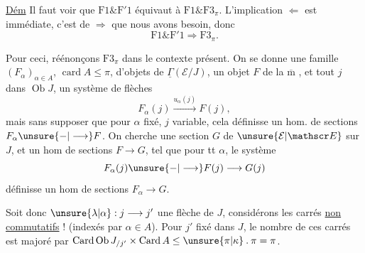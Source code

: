 
\uline{Dém} Il faut voir que $\mathrm F1\mathbin{\&}\mathrm F'1$ équivaut à $\mathrm F1\mathbin{\&}\mathrm F3_{\pi}$. L'implication $\Longleftarrow$ est \inserted{$\pm$} immédiate, c'est de $\Longrightarrow$ que nous avons besoin, donc
\[
 \mathrm F1\mathbin{\&}\mathrm F'1\Longrightarrow\mathrm F3_{\pi}.
\]

Pour ceci,  réénonçons $\mathrm F3_{\pi}$ dans le contexte présent. On se donne une famille $(F_{\alpha})_{\alpha\in A}$, $\operatorname{card}A\leq\pi$, d'objets de $\underline{\Gamma}(\mathcal E/J)$, un objet $F$ de la $\overline{\mathrm m}$ , et  tout $j$ dans $\operatorname{Ob}J$, un système de flèches
\[
 F_{\alpha}(j)\xrightarrow{u_{\alpha}(j)} F(j),
\]
mais sans supposer que pour $\alpha$ fixé, $j$ variable,
cela définisse un hom. de sections $F_{\alpha}\unsure{\mathbin{-}|\longrightarrow}F$. On cherche une section $G$ de $\unsure{\mathcal E|\mathscr E}$ sur $J$, et un hom de sections $F\longrightarrow G$, tel que pour tt $\alpha$, le système  
\[
 F_{\alpha}(j)\unsure{\mathbin{-}|\longrightarrow} F(j)\longrightarrow G(j)
\]
 définisse un hom de sections $F_{\alpha}\longrightarrow G$.

Soit donc $\unsure{\lambda|\alpha}:j\longrightarrow j'$ une flèche de $J$, considérons les carrés \unsure{(}\uline{non commutatifs} !\unsure{,}
(indexés par $\alpha\in A$). Pour $j'$ fixé dans $J$, le nombre de ces carrés est majoré par $\operatorname{Card}\operatorname{Ob}J_{/j'}\times\operatorname{Card}A\leq\unsure{\pi|\kappa}\mathbin{.}\pi=\pi$.

